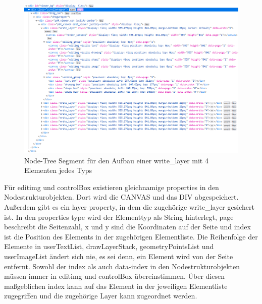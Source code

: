\begin{figure}[!htbp]
	\centering
	\includegraphics[width=1\textwidth]{"images/write-layer.png"}
	\caption{Node-Tree Segment für den Aufbau einer write\_layer mit 4 Elementen jedes Typs}
	\label{fig:write-layer}
\end{figure}

Für editimg und controlBox existieren gleichnamige properties in den Nodestrukturobjekten. Dort wird die CANVAS und das DIV abgespeichert. Außerdem gibt es ein layer property, in dem die zugehörige write\_layer gesichert ist. In den properties type wird der Elementtyp als String hinterlegt, page beschreibt die Seitenzahl, x und y sind die Koordinaten auf der Seite und index ist die Position des Elements in der zugehörigen Elementliste. Die Reihenfolge der Elemente in userTextList, drawLayerStack, geometryPointsList und userImageList ändert sich nie, es sei denn, ein Element wird von der Seite entfernt. Sowohl der index als auch data-index in den Nodestrukturobjekten müssen immer in editimg und controlBox übereinstimmen. Über diesen maßgeblichen index kann auf das Element in der jeweiligen Elementliste zugegriffen und die zugehörige Layer kann zugeordnet werden.

